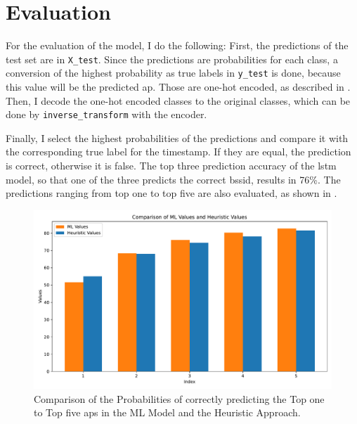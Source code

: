 \chapter{Evaluation}\label{ch:evaluation}

For the evaluation of the model, I do the following:
First, the predictions of the test set are in \texttt{X\_test}.
Since the predictions are probabilities for each class, a conversion of the highest probability as true labels in \texttt{y\_test} is done, because this value will be the predicted \ac{ap}.
Those are one-hot encoded, as described in .
Then, I decode the one-hot encoded classes to the original classes, which can be done by \texttt{inverse\_transform} with the encoder.

Finally, I select the highest probabilities of the predictions and compare it with the corresponding true label for the timestamp.
If they are equal, the prediction is correct, otherwise it is false.
The top three prediction accuracy of the \ac{lstm} model, so that one of the three predicts the correct \ac{bssid}, results in 76\%.
The predictions ranging from top one to top five are also evaluated, as shown in .

\begin{figure}[h]
    \centering
    \includegraphics*[scale=0.53]{images/comparison_ml_heuristic_1_to_5.pdf}
    \caption{Comparison of the Probabilities of correctly predicting the Top one to Top five \acp{ap} in the ML Model and the Heuristic Approach.}
    \label{fig:comparison_ml_heuristic_1_to_5}
\end{figure}

